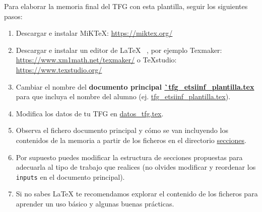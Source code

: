 \vspace*{1.5cm}
Para elaborar la memoria final del TFG con esta plantilla, seguir los siguientes pasos:
\begin{enumerate}
\item Descargar e instalar MiKTeX:  \url{https://miktex.org/}
\item Descargar e instalar un editor de \LaTeX~ , por ejemplo Texmaker:
\url{https://www.xm1math.net/texmaker/} o TeXstudio: \url{https://www.texstudio.org/}
\item Cambiar el nombre del \textbf{documento principal
    \url{`tfg_etsiinf_plantilla.tex}} para que incluya el nombre del
  alumno (ej. \url{tfg_etsiinf_plantilla.tex}).
\item Modifica los datos de tu TFG en \url{datos_tfg.tex}.
\item Observa el fichero documento principal y cómo se van incluyendo
  los contenidos de la memoria a partir de los ficheros en el
  directorio \url{secciones}.
\item Por supuesto puedes modificar la estructura de secciones
  propuestas para adecuarla al tipo de trabajo que realices (no
  olvides modificar y reordenar los \texttt{inputs} en el documento
  principal).
\item Si no sabes LaTeX te recomendamos explorar el contenido de los
  ficheros para aprender un uso básico y algunas buenas prácticas.
\end{enumerate}
